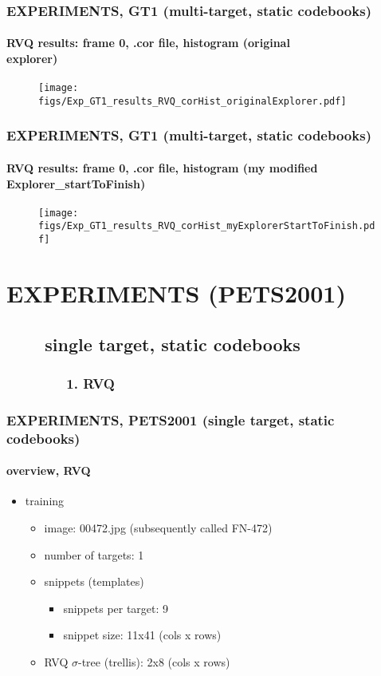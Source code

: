 \begin{frame}
\frametitle{\small EXPERIMENTS, GT1 (multi-target, static codebooks)}
\framesubtitle{RVQ results: frame 0, .cor file, histogram (original \\  explorer)}
\mypagenum
	\begin{figure}
		\texttt{[image: figs/Exp\_GT1\_results\_RVQ\_corHist\_originalExplorer.pdf]}
	\end{figure}
\end{frame}




\begin{frame}
\frametitle{\small EXPERIMENTS, GT1 (multi-target, static codebooks)}
\framesubtitle{RVQ results: frame 0, .cor file, histogram (my modified Explorer\_startToFinish)}
\mypagenum
	\begin{figure}
		\texttt{[image: figs/Exp\_GT1\_results\_RVQ\_corHist\_myExplorerStartToFinish.pdf]}
	\end{figure}
\end{frame}


\section{EXPERIMENTS (PETS2001)}

\subsection{\ \ \ \ single target, static codebooks}

\subsubsection{\ \ \ \ \ \ \ \ 1. RVQ}

\begin{frame}
\frametitle{\small EXPERIMENTS, PETS2001 (single target, static codebooks)}
\framesubtitle{overview, RVQ}
\mypagenum
	\begin{itemize}
		\item {\color{red} training}
			\begin{itemize}
				\item image: 00472.jpg (subsequently called FN-472)
				\item number of targets: 1
				\item snippets (templates)
					\begin{itemize}
						\item snippets per target: 9
						\item snippet size: 11x41 (cols x rows)
					\end{itemize}
				\item RVQ $\sigma$-tree (trellis): 2x8 (cols x rows)
			\end{itemize}
	\end{itemize}
\end{frame}



